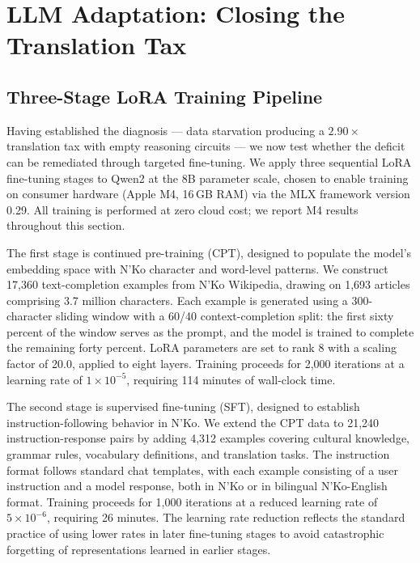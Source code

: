 \documentclass[11pt]{article}
\newcommand{\nko}{N'Ko}
\begin{document}
\section{LLM Adaptation: Closing the Translation Tax}
\label{sec:llm_adaptation}

\subsection{Three-Stage LoRA Training Pipeline}
\label{sec:lora_pipeline}

Having established the diagnosis --- data starvation producing a $2.90\times$ translation tax with empty reasoning circuits --- we now test whether the deficit can be remediated through targeted fine-tuning. We apply three sequential LoRA fine-tuning stages to Qwen2 at the 8B parameter scale, chosen to enable training on consumer hardware (Apple M4, 16\,GB RAM) via the MLX framework version 0.29. All training is performed at zero cloud cost; we report M4 results throughout this section.

The first stage is continued pre-training (CPT), designed to populate the model's embedding space with \nko{} character and word-level patterns. We construct 17,360 text-completion examples from \nko{} Wikipedia, drawing on 1,693 articles comprising 3.7 million characters. Each example is generated using a 300-character sliding window with a 60/40 context-completion split: the first sixty percent of the window serves as the prompt, and the model is trained to complete the remaining forty percent. LoRA parameters are set to rank 8 with a scaling factor of 20.0, applied to eight layers. Training proceeds for 2,000 iterations at a learning rate of $1 \times 10^{-5}$, requiring 114 minutes of wall-clock time.

The second stage is supervised fine-tuning (SFT), designed to establish instruction-following behavior in \nko{}. We extend the CPT data to 21,240 instruction-response pairs by adding 4,312 examples covering cultural knowledge, grammar rules, vocabulary definitions, and translation tasks. The instruction format follows standard chat templates, with each example consisting of a user instruction and a model response, both in \nko{} or in bilingual \nko{}-English format. Training proceeds for 1,000 iterations at a reduced learning rate of $5 \times 10^{-6}$, requiring 26 minutes. The learning rate reduction reflects the standard practice of using lower rates in later fine-tuning stages to avoid catastrophic forgetting of representations learned in earlier stages.
\end{document}
